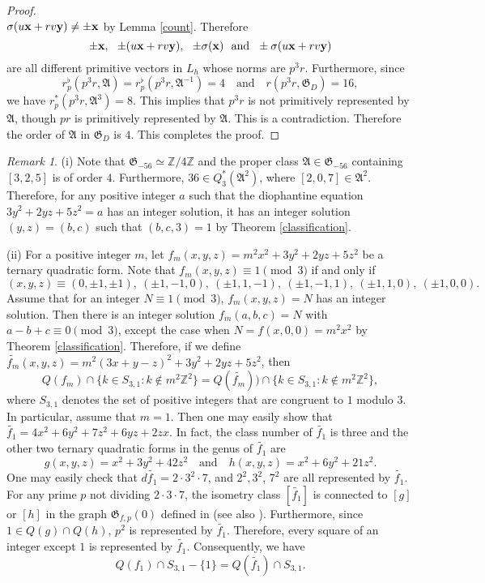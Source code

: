 \documentclass{amsart}
\theoremstyle{definition}
\theoremstyle{remark}
\newtheorem{rmk}[thm]{Remark}
\numberwithin{equation}{section}
\begin{document}
\begin{proof}
$$$$
$\sigma(u\bold x+rv\bold y)\ne \pm \bold x$ by Lemma \ref{count}. Therefore 
$$
\pm \bold x, \  \ \pm (u\bold x+rv\bold y), \  \ \pm \sigma(\bold x) \ \ \text{and}  \ \  \pm \sigma(u\bold x+rv\bold y)
$$
 are all different primitive vectors  in $L_h$ whose norms are $p^3r$.  Furthermore, since 
 $$
 r_p^{\flat}(p^3r,\mathfrak A)=r_p^{\flat}(p^3r,\mathfrak A^{-1})=4 \quad \text{and}  \quad r(p^3r,\mathfrak G_D)=16,
 $$
  we have  $r_p^*(p^3r,\mathfrak A^3)=8$.   This implies that $p^3r$ is not primitively represented by $\mathfrak A$, though $pr$ is primitively represented by $\mathfrak A$. This is a contradiction. Therefore the order of $\mathfrak A$ in $\mathfrak G_D$ is $4$. This completes the proof.
\end{proof}

\begin{rmk} {\rm (i) Note that $\mathfrak G_{-56} \simeq {{\mathbb Z}}/4{{\mathbb Z}}$ and the proper class $\mathfrak A \in \mathfrak G_{-56}$ containing $[3,2,5]$ is of order $4$. Furthermore, 
 $36 \in Q_3^*(\mathfrak A^2)$, where $[2,0,7] \in \mathfrak A^2$. Therefore, for any positive integer $a$ such that the diophantine equation $3y^2+2yz+5z^2=a$ has an integer solution, it has an integer solution $(y,z)=(b,c)$ such that $(b,c,3)=1$ by Theorem \ref{classification}.
 \vskip 0.2cm 
 
\noindent (ii)  For a positive integer $m$, let $f_m(x,y,z)=m^2x^2+3y^2+2yz+5z^2$ be a ternary quadratic form.  Note that $f_m(x,y,z) \equiv 1 \pmod 3$ if and only if 
 $$
 (x,y,z) \equiv (0,\pm1,\pm1), \ (\pm1,-1,0), \ (\pm1,1,-1), \ (\pm1, -1,1), \ (\pm1,1,0), \ (\pm1,0,0).
 $$
Assume that for an integer $N \equiv 1 \pmod 3$, $f_m(x,y,z)=N$ has an integer solution. Then there is an integer solution
$f_m(a,b,c)=N$ with $a-b+c \equiv 0 \pmod 3$, except the case when $N=f(x,0,0)=m^2x^2$ by Theorem \ref{classification}. Therefore, if we define $\widetilde{f_m}(x,y,z)=m^2(3x+y-z)^2+3y^2+2yz+5z^2$, then
$$
Q(f_m) \cap  \{ k \in S_{3,1} : k \not \in m^2{{\mathbb Z}}^2 \} =Q(\widetilde{f_m})) \cap  \{ k \in S_{3,1} : k \not \in m^2{{\mathbb Z}}^2\},
$$
 where $S_{3,1}$ denotes the set of positive integers that are congruent to $1$ modulo $3$.
In particular, assume that $m=1$. Then one may easily show that $\widetilde{f_1}=4x^2+6y^2+7z^2+6yz+2zx$. In fact, the class number of  $\widetilde{f_1}$ is three and the other two ternary quadratic forms in the genus of $\widetilde{f_1}$ are 
$$
g(x,y,z)=x^2+3y^2+42z^2\quad  \text{and} \quad h(x,y,z)=x^2+6y^2+21z^2.
$$
 One may easily check that $d\widetilde{f_1}=2\cdot3^2\cdot7$, and $2^2, 3^2$, $7^2$  are all represented by $\widetilde{f_1}$.  For any prime $p$ not dividing $2\cdot3\cdot7$, the isometry class $[\widetilde{f_1}]$ is connected to $[g]$ or $[h]$ in the graph $\mathfrak G_{f,p}(0)$ defined in \cite{jlo} (see also \cite{bh}). Furthermore, since $1 \in Q(g)\cap Q(h)$, $p^2$ is represented by $\widetilde{f_1}$. Therefore, every square of an integer except $1$ is represented by $\widetilde{f_1}$. Consequently, we have 
$$
Q(f_1) \cap  S_{3,1} -\{1\}=Q(\widetilde{f_1}) \cap S_{3,1}.
$$ } 
\end{rmk}
\end{document}
